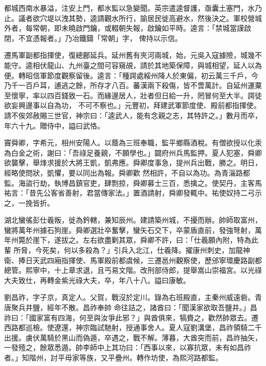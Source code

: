 \begin{pinyinscope}
 都城西南水暴溢，注安上門，都水監以急變聞。英宗遣逵督護，亟囊土塞門，水乃止。議者欲穴堤以洩其勢，逵請觀水所行，諭居民徙高避水，然後決之。軍校營城外者，每常朝，即未曉啟門鑰，或輟朝失報，啟鑰如平時。逵言：「禁城當謹啟閉，不宜憑報者。」乃冶鐵鑄「常朝」字，
 俾持以示信。



 遷馬軍副都指揮使，復總鄜延兵。延州舊有夾河兩城，始，元吳入寇據險，城幾不能守。逵相伏龍山、九州臺之間可容窺覘，請於其地築保障，與城相望，延人以為便。轉昭信軍節度觀察留後。逵言：「種諤處綏州降人於東偏，初云萬三千戶，今乃千一百戶耳，逋逃之餘，所存才八百。蕃漢兩下殺傷，皆不啻萬計。自延州運粟至懷寧，率以四百錢致一石。而緣邊居人，壯者但日給一升，罔冒何至大半。諤徒欲妄興邊事以自為功，
 不可不察也。」元豐初，拜建武軍節度使、殿前都指揮使。請不俟郊赦賜三世官，神宗曰：「逵武人，能有念親之志，其特許之。」數月而卒，年六十九。贈侍中，謚曰武恪。



 竇舜卿，字希元，相州安陽人。以蔭為三班奉職，監平鄉縣酒稅。有僧欲授以化汞為白金之術，謝曰：「吾祿足養親，不願學也。」闢府州兵馬監押。夏人犯塞，舜卿欲襲擊，舉烽求援於大將王凱，凱弗應。舜卿度事急，提州兵出戰，勝之。明日，經略使問狀，凱懼，要以同出為報。舜卿歡
 然相許，不自以為功。為青淄路都監。海盜行劫，執博昌鎮官吏，肆剽掠，舜卿募士三百，悉擒之。使契丹，主客馬祐言：「昔先公客省善射，君當傳家法。」置酒請射，舜卿發輒中。祐使奴持二弓示之，一挽皆折。



 湖北蠻徭彭仕羲叛，徙為鈐轄，兼知辰州。建請築州城，不擾而辦。帥師取富州，蠻將萬年州據石狗崖。舜卿選壯卒奮擊，蠻矢石交下，卒蒙盾直前，發強弩射，萬年州斃於崖下，遂拔之。左右欲盡剿其眾，舜卿不許，曰：「仕羲願內附，特為此輩
 所脅，今死矣，何以多殺為？」引兵入北江，仕羲降。擢康州刺史，加龍神衛、捧日天武四廂指揮使、馬軍殿前都虞候，三遷邕州觀察使，歷邠寧環慶路副都總管。熙寧中，十上章求退，且丐易文階。改刑部侍郎，提舉嵩山崇福宮。以光祿大夫致仕，再轉金紫光祿大夫，卒，年八十八。謚曰康敏。



 劉昌祚，字子京，真定人。父賀，戰沒於定川。錄為右班殿直，主秦州威遠砦。青唐聚兵井鹽，經年不散。昌祚奉帥
 命往詰之，諸酋曰：「聞漢家欲取吾鹽井。」昌祚曰：「國家富有四海，何至與汝爭此邪？」與酋俱來，犒賚之，歡然帥眾去。遷西路都巡檢。使遼還，神宗臨試馳射，授通事舍人。夏人寇劉溝堡，昌祚領騎二千出援。虜伏萬騎於黑山而偽遁，卒遇之，戰不解。薄暮，大酋突而前，昌祚抽矢，一發殪之，餘眾悉遁。帥李師中上其功曰：「西事以來，以寡抗眾，未有如昌祚者。」知階州，討平毋家等族，又平疊州。轉作坊使，為熙河路都監。




\end{pinyinscope}
